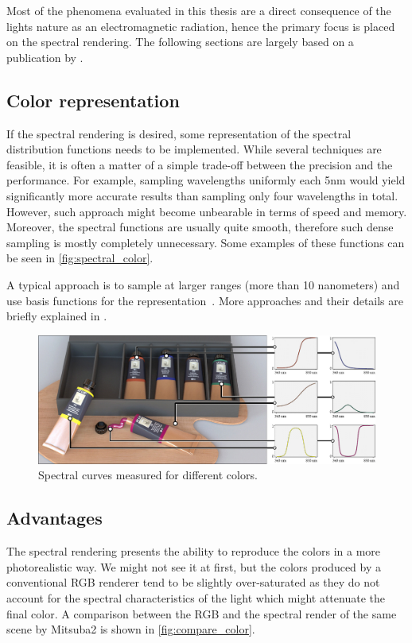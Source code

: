 Most of the phenomena evaluated in this thesis are a direct consequence of the lights nature as an electromagnetic radiation, hence the primary focus is placed on the spectral rendering.
The following sections are largely based on a publication by \citet{wilkie2002tone}.

\subsection{Color representation}

If the spectral rendering is desired, some representation of the spectral distribution functions needs to be implemented. While several techniques are feasible, it is often a matter of a simple trade-off between the precision and the performance. For example, sampling wavelengths uniformly each 5nm would yield significantly more accurate results than sampling only four wavelengths in total. However, such approach might become unbearable in terms of speed and memory. Moreover, the spectral functions are usually quite smooth, therefore such dense sampling is mostly completely unnecessary. Some examples of these functions can be seen in \autoref{fig:spectral_color}.

A typical approach is to sample at larger ranges (more than 10 nanometers) and use basis functions for the representation~\cite{peercy1993linear}. More approaches and their details are briefly explained in \citet{wilkie2002tone}.

\begin{figure}[httpb]
	\centering
	\includegraphics[width=.9\linewidth]{img/spectral_color.jpg}
	\caption{Spectral curves measured for different colors\cite{jakob2019low}.}
	\label{fig:spectral_color}
\end{figure}

\subsection{Advantages}

The spectral rendering presents the ability to reproduce the colors in a more photorealistic way. We might not see it at first, but the colors produced by a conventional RGB renderer tend to be slightly over-saturated as they do not account for the spectral characteristics of the light which might attenuate the final color. A comparison between the RGB and the spectral render of the same scene by Mitsuba2 is shown in \autoref{fig:compare_color}.

